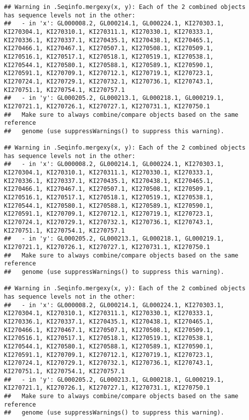 \documentclass[
]{article}
\begin{document}
\begin{verbatim}
## Warning in .Seqinfo.mergexy(x, y): Each of the 2 combined objects has sequence levels not in the other:
##   - in 'x': GL000008.2, GL000214.1, GL000224.1, KI270303.1, KI270304.1, KI270310.1, KI270311.1, KI270330.1, KI270333.1, KI270336.1, KI270337.1, KI270435.1, KI270438.1, KI270465.1, KI270466.1, KI270467.1, KI270507.1, KI270508.1, KI270509.1, KI270516.1, KI270517.1, KI270518.1, KI270519.1, KI270538.1, KI270544.1, KI270580.1, KI270588.1, KI270589.1, KI270590.1, KI270591.1, KI270709.1, KI270712.1, KI270719.1, KI270723.1, KI270724.1, KI270729.1, KI270732.1, KI270736.1, KI270743.1, KI270751.1, KI270754.1, KI270757.1
##   - in 'y': GL000205.2, GL000213.1, GL000218.1, GL000219.1, KI270721.1, KI270726.1, KI270727.1, KI270731.1, KI270750.1
##   Make sure to always combine/compare objects based on the same reference
##   genome (use suppressWarnings() to suppress this warning).

## Warning in .Seqinfo.mergexy(x, y): Each of the 2 combined objects has sequence levels not in the other:
##   - in 'x': GL000008.2, GL000214.1, GL000224.1, KI270303.1, KI270304.1, KI270310.1, KI270311.1, KI270330.1, KI270333.1, KI270336.1, KI270337.1, KI270435.1, KI270438.1, KI270465.1, KI270466.1, KI270467.1, KI270507.1, KI270508.1, KI270509.1, KI270516.1, KI270517.1, KI270518.1, KI270519.1, KI270538.1, KI270544.1, KI270580.1, KI270588.1, KI270589.1, KI270590.1, KI270591.1, KI270709.1, KI270712.1, KI270719.1, KI270723.1, KI270724.1, KI270729.1, KI270732.1, KI270736.1, KI270743.1, KI270751.1, KI270754.1, KI270757.1
##   - in 'y': GL000205.2, GL000213.1, GL000218.1, GL000219.1, KI270721.1, KI270726.1, KI270727.1, KI270731.1, KI270750.1
##   Make sure to always combine/compare objects based on the same reference
##   genome (use suppressWarnings() to suppress this warning).

## Warning in .Seqinfo.mergexy(x, y): Each of the 2 combined objects has sequence levels not in the other:
##   - in 'x': GL000008.2, GL000214.1, GL000224.1, KI270303.1, KI270304.1, KI270310.1, KI270311.1, KI270330.1, KI270333.1, KI270336.1, KI270337.1, KI270435.1, KI270438.1, KI270465.1, KI270466.1, KI270467.1, KI270507.1, KI270508.1, KI270509.1, KI270516.1, KI270517.1, KI270518.1, KI270519.1, KI270538.1, KI270544.1, KI270580.1, KI270588.1, KI270589.1, KI270590.1, KI270591.1, KI270709.1, KI270712.1, KI270719.1, KI270723.1, KI270724.1, KI270729.1, KI270732.1, KI270736.1, KI270743.1, KI270751.1, KI270754.1, KI270757.1
##   - in 'y': GL000205.2, GL000213.1, GL000218.1, GL000219.1, KI270721.1, KI270726.1, KI270727.1, KI270731.1, KI270750.1
##   Make sure to always combine/compare objects based on the same reference
##   genome (use suppressWarnings() to suppress this warning).


\end{verbatim}
\end{document}
